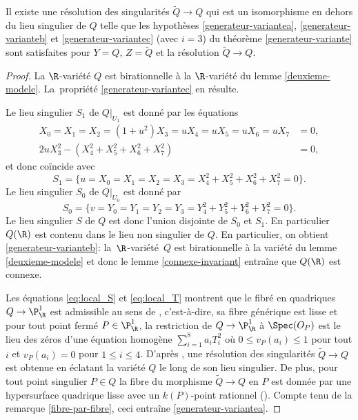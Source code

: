 \begin{lemma}\label{fibration-quadriques-a-c}
Il existe une résolution des singularités $\tilde{Q}\to Q$ qui est un isomorphisme en dehors du lieu singulier de $Q$ telle que les hypothèses \eqref{generateur-variantea}, \eqref{generateur-varianteb} et \eqref{generateur-variantec} (avec $i=3$) du théorème \ref{generateur-variante} sont satisfaites pour $Y=Q$, $Z=\tilde{Q}$ et la résolution $\tilde{Q}\to Q$.
\end{lemma}

\begin{proof}
La $\R$-variété $Q$ est birationnelle à la $\R$-variété du lemme \ref{deuxieme-modele}. La~propriété \eqref{generateur-variantec} en résulte.

Le lieu singulier $S_1$ de $Q|_{U_1}$ est donné par les équations
\begin{align*}
X_0=X_1=X_2=(1+u^2)X_3=uX_4=uX_5=uX_6=uX_7&=0, \\
2uX_3^2-(X_4^2+X_5^2+X_6^2+X_7^2)&=0,
\end{align*}
et donc coïncide avec
\[S_1=\{u=X_0=X_1=X_2=X_3=X_4^2+X_5^2+X_6^2+X_7^2=0\}.\]
Le lieu singulier $S_0$ de $Q|_{U_0}$ est donné par
\[S_0=\{v=Y_0=Y_1=Y_2=Y_3=Y_4^2+Y_5^2+Y_6^2+Y_7^2=0\}.\]
Le lieu singulier $S$ de $Q$ est donc l'union disjointe de $S_0$ et $S_1$. En particulier $Q(\R)$ est contenu dans le lieu non singulier de $Q$. En particulier, on obtient \eqref{generateur-varianteb}: la~$\R$\nobreakdash-variété~$Q$ est birationnelle à la variété du lemme \ref{deuxieme-modele} et donc le lemme \ref{connexe-invariant} entraîne que $Q(\R)$ est connexe.

Les équations \eqref{eq:local_S} et \eqref{eq:local_T} montrent que le fibré en quadriques $Q\to \P^1_\R$ est admissible au sens de \cite[Déf.\,3.1]{colliot1993groupe}, c'est-à-dire, sa fibre générique est lisse et pour tout point fermé $P\in \P^1_\R$, la restriction de $Q\to \P^1_\R$ à $\Spec(O_P)$ est le lieu des zéros d'une équation homogène $\sum_{i=1}^8 a_iT_i^2$ où $0\leq v_P(a_i)\leq 1$ pour tout $i$ et $v_P(a_i)=0$ pour $1\leq i\leq 4$. D'après \cite[Th.\,3.3(a)]{colliot1993groupe}, une résolution des singularités $\tilde{Q}\to Q$ est obtenue en éclatant la variété $Q$ le long de son lieu singulier. De plus, pour tout point singulier $P\in Q$ la fibre du morphisme $\tilde{Q}\to Q$ en $P$ est donnée par une hypersurface quadrique lisse avec un $k(P)$-point rationnel (\cf \cite[bas de p.\,488]{colliot1993groupe}). Compte tenu de la remarque \ref{fibre-par-fibre}, ceci entraîne \eqref{generateur-variantea}.
\end{proof}

